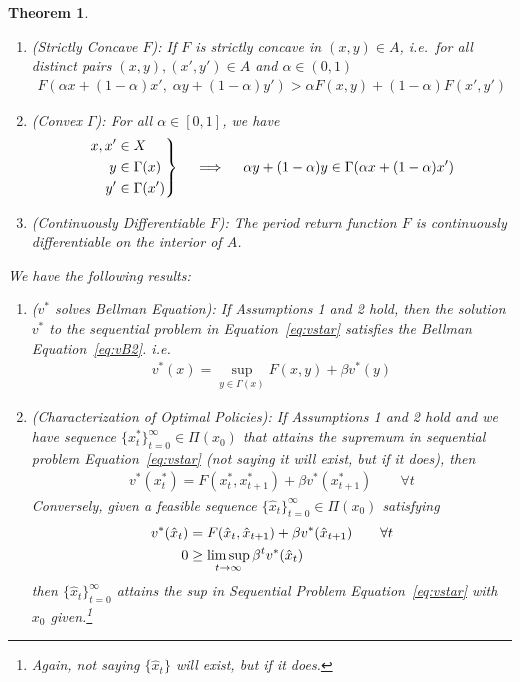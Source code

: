 \documentclass[12pt]{article}
\numberwithin{equation}{section} %
\theoremstyle{plain}
\newtheorem{thm}{Theorem}[section]
\theoremstyle{definition}
\theoremstyle{remark}
\newcommand{\ra}{\rightarrow}
\newenvironment{rcases}
  {\left.\begin{aligned}}
  {\end{aligned}\right\rbrace}
\newcommand{\tinfz}{_{t=0}^\infty}
\begin{document}
\begin{thm}
\begin{enumerate}
  \item
    \emph{(Strictly Concave $F$)}:
    If $F$ is strictly concave in $(x,y)\in A$, i.e.\ for all distinct
    pairs $(x,y), (x',y') \in A$ and $\alpha \in (0,1)$
    \begin{align*}
      F\left(\alpha x + (1-\alpha)x', \; \alpha y + (1-\alpha)y'\right)
      >
      \alpha F(x,y) + (1-\alpha)F(x',y')
    \end{align*}

  \item
    \emph{(Convex $\Gamma$)}:
    For all $\alpha\in[0,1]$, we have
    \begin{align*}
      \begin{rcases}
        x,x' &\in X \\
        y&\in \Gamma(x) \\
        y'&\in \Gamma(x')
      \end{rcases}
      \quad\implies\quad
      \alpha y + (1-\alpha) y
      \in \Gamma(\alpha x + (1-\alpha) x')
    \end{align*}

  \item
    \emph{(Continuously Differentiable $F$)}:
    The period return function $F$ is continuously differentiable on the
    interior of $A$.
\end{enumerate}
We have the following results:
\begin{enumerate}
  \item
    \emph{($v^*$ solves Bellman Equation)}:
    If Assumptions 1 and 2 hold, then the solution $v^*$ to the
    sequential problem in Equation~\ref{eq:vstar} satisfies the Bellman
    Equation~\ref{eq:vB2}. i.e.\
    \begin{align*}
      v^*(x) =
      \sup_{y \in \Gamma(x)}
      F(x,y) + \beta v^*(y)
    \end{align*}

  \item
    \emph{(Characterization of Optimal Policies)}:
    If Assumptions 1 and 2 hold and we have sequence
    $\{x^*_t\}\tinfz\in\Pi(x_0)$ that attains the supremum in sequential
    problem Equation~\ref{eq:vstar} (not saying it will exist, but if it
    does), then
    \begin{align*}
      v^*(x^*_t) = F(x^*_t,x^*_{t+1}) + \beta v^*(x^*_{t+1})
      \qquad \forall t
    \end{align*}
    Conversely, given a feasible sequence
    $\{\hat{x}_t\}\tinfz \in\Pi(x_0)$ satisfying
    \begin{align}
      v^*(\hat{x}_t)
      &= F(\hat{x}_t,\hat{x}_{t+1})
        + \beta v^*(\hat{x}_{t+1}) \qquad \forall t\notag\\
      0 &\geq
      \limsup_{t\ra\infty}
      \beta^t v^*(\hat{x}_t)
      \label{weak-tvc}
    \end{align}
    then $\{\hat{x}_t\}\tinfz$ attains the sup in Sequential
    Problem Equation~\ref{eq:vstar} with $x_0$ given.\footnote{%
      Again, not saying $\{\hat{x}_t\}$ will exist, but if it does.}


\end{enumerate}
\end{thm}
\end{document}
